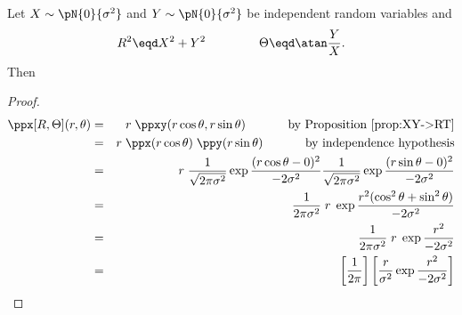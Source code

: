 \begin{proposition}
\label{prop:XY->RT_n}
Let $X\sim\pN{0}{\sigma^2}$ and $Y\sim\pN{0}{\sigma^2}$ be
independent random variables and
\[ R^2 \eqd X^2 + Y^2 \hspace{10ex} \Theta \eqd \atan\frac{Y}{X}. \]
Then
\end{proposition}
\begin{proof}
\begin{eqnarray*}
  \ppx[R,\Theta](r,\theta)
    &=& r\;\ppxy(r\cos\theta,r\sin\theta)
        \hspace{8ex}\mbox{by Proposition~\ref{prop:XY->RT}}
  \\&=& r\;\ppx(r\cos\theta) \; \ppy(r\sin\theta)
        \hspace{8ex}\mbox{by independence hypothesis}
  \\&=& r\;
        \frac{1}{\sqrt{2\pi\sigma^2}}\exp{\frac{(r\cos\theta-0)^2}{-2\sigma^2}}
        \frac{1}{\sqrt{2\pi\sigma^2}}\exp{\frac{(r\sin\theta-0)^2}{-2\sigma^2}}
  \\&=& \frac{1}{2\pi\sigma^2}\;r\;
        \exp{\frac{r^2(\cos^2\theta + \sin^2\theta)}{-2\sigma^2}}
  \\&=& \frac{1}{2\pi\sigma^2}\;r\;
        \exp{\frac{r^2}{-2\sigma^2}}
  \\&=& \left[\frac{1}{2\pi}\right]
        \left[\frac{r}{\sigma^2}\exp{\frac{r^2}{-2\sigma^2}}\right]
\end{eqnarray*}
\end{proof}


